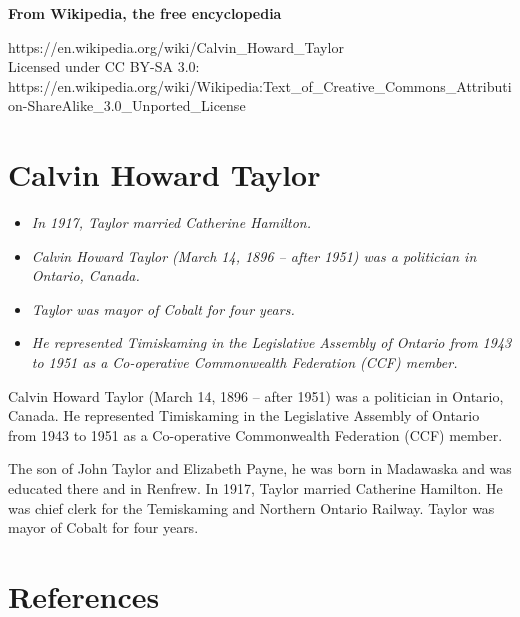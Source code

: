 \textbf{From Wikipedia, the free encyclopedia}

https://en.wikipedia.org/wiki/Calvin\_Howard\_Taylor\\
Licensed under CC BY-SA 3.0:\\
https://en.wikipedia.org/wiki/Wikipedia:Text\_of\_Creative\_Commons\_Attribution-ShareAlike\_3.0\_Unported\_License

\section{Calvin Howard Taylor}\label{calvin-howard-taylor}

\begin{itemize}
\item
  \emph{In 1917, Taylor married Catherine Hamilton.}
\item
  \emph{Calvin Howard Taylor (March 14, 1896 -- after 1951) was a
  politician in Ontario, Canada.}
\item
  \emph{Taylor was mayor of Cobalt for four years.}
\item
  \emph{He represented Timiskaming in the Legislative Assembly of
  Ontario from 1943 to 1951 as a Co-operative Commonwealth Federation
  (CCF) member.}
\end{itemize}

Calvin Howard Taylor (March 14, 1896 -- after 1951) was a politician in
Ontario, Canada. He represented Timiskaming in the Legislative Assembly
of Ontario from 1943 to 1951 as a Co-operative Commonwealth Federation
(CCF) member.

The son of John Taylor and Elizabeth Payne, he was born in Madawaska and
was educated there and in Renfrew. In 1917, Taylor married Catherine
Hamilton. He was chief clerk for the Temiskaming and Northern Ontario
Railway. Taylor was mayor of Cobalt for four years.

\section{References}\label{references}
